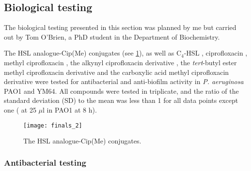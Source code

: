 \subsection{Biological testing\label{sec:bio2}}

The biological testing presented in this section was planned by me but carried out by Tom O'Brien, a PhD student in the Department of Biochemistry.

The HSL analogue-Cip(Me) conjugates (see \ref{fgr:finals_2}), as well as C$_4$-HSL , ciprofloxacin , methyl ciprofloxacin , the alkynyl ciprofloxacin derivative , the \textit{tert}-butyl ester methyl ciprofloxacin derivative  and the carboxylic acid methyl ciprofloxacin derivative  were tested for antibacterial and anti-biofilm activity in \textit{P. aeruginosa} PAO1\cite{Stover2000} and YM64\cite{Morita2001}.
All compounds were tested in triplicate, and the ratio of the standard deviation (SD) to the mean was less than 1 for all data points except one ( at 25 $\mu$l in PAO1 at 8 h).

\begin{figure}[H]
	\begin{center}
		\texttt{[image: finals\_2]}
		\caption{The HSL analogue-Cip(Me) conjugates.
 		\label{fgr:finals_2}}
	\end{center}
\end{figure}

\subsubsection{Antibacterial testing}

